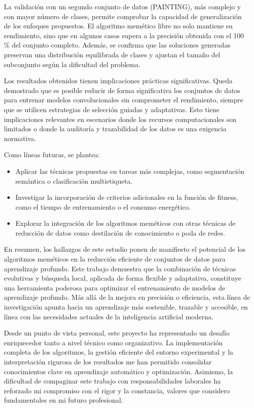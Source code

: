 La validación con un segundo conjunto de datos (PAINTING), más complejo y con mayor número de clases, permite comprobar la capacidad de generalización de los enfoques propuestos.
El algoritmo memético libre no solo mantiene su rendimiento, sino que en algunos casos supera a la precisión obtenida con el 100\,\% del conjunto completo.
Además, se confirma que las soluciones generadas preservan una distribución equilibrada de clases y ajustan el tamaño del subconjunto según la dificultad del problema.


Los resultados obtenidos tienen implicaciones prácticas significativas.
Queda demostrado que es posible reducir de forma significativa los conjuntos de datos para entrenar modelos convolucionales sin comprometer el rendimiento,
siempre que se utilicen estrategias de selección guiadas y adaptativas.
Esto tiene implicaciones relevantes en escenarios donde los recursos computacionales son limitados o donde la auditoría y trazabilidad de los datos es una exigencia normativa.

Como líneas futuras, se plantea:
\begin{itemize}
      \item Aplicar las técnicas propuestas en tareas más complejas, como segmentación semántica o clasificación multietiqueta.
      \item Investigar la incorporación de criterios adicionales en la función de fitness, como el tiempo de entrenamiento o el consumo energético.
      \item Explorar la integración de los algoritmos meméticos con otras técnicas de reducción de datos como destilación de conocimiento o poda de redes.
\end{itemize}

En resumen, los hallazgos de este estudio ponen de manifiesto el potencial de los algoritmos meméticos en la reducción eficiente de conjuntos de datos para aprendizaje profundo.
Este trabajo demuestra que la combinación de técnicas evolutivas y búsqueda local, aplicada de forma flexible y adaptativa,
constituye una herramienta poderosa para optimizar el entrenamiento de modelos de aprendizaje profundo.
Más allá de la mejora en precisión o eficiencia, esta línea de investigación apunta hacia un aprendizaje más sostenible, trazable y accesible,
en línea con las necesidades actuales de la inteligencia artificial moderna.

Desde un punto de vista personal, este proyecto ha representado un desafío enriquecedor tanto a nivel técnico como organizativo.
La implementación completa de los algoritmos, la gestión eficiente del entorno experimental y
la interpretación rigurosa de los resultados me han permitido consolidar conocimientos clave en aprendizaje automático y optimización.
Asimismo, la dificultad de compaginar este trabajo con responsabilidades laborales ha reforzado mi compromiso con el rigor y la constancia,
valores que considero fundamentales en mi futuro profesional.